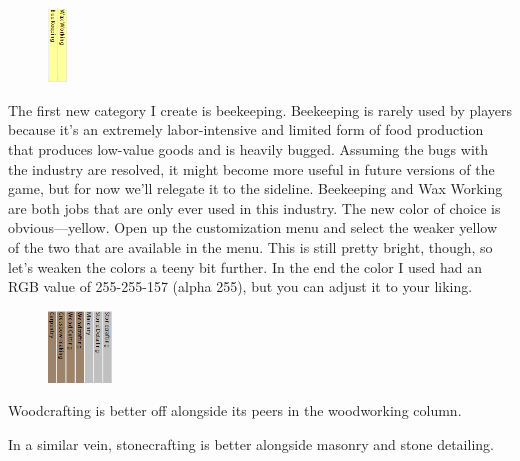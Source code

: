 \documentclass[]{article}
\begin{document}
\begin{figure}
\vspace{-20pt}
  \begin{center}
    \includegraphics[width=0.045\textwidth]{Sec3Fig19}
  \end{center}
\vspace{-15pt}
\end{figure}
The first new category I create is beekeeping. Beekeeping is rarely used by players because it's an
extremely labor-intensive and limited form of food production that produces low-value goods and is
heavily bugged. Assuming the bugs with the industry are resolved, it might become more useful in future
versions of the game, but for now we'll relegate it to the sideline.
Beekeeping and Wax Working are both jobs that are only ever used in this industry. The new color of
choice is obvious---yellow.
Open up the customization menu and select the weaker yellow of the two that are available in the menu.
This is still pretty bright, though, so let's weaken the colors a teeny bit further. In the end the color
I used had an RGB value of 255-255-157 (alpha 255), but you can adjust it to your liking.

\begin{figure}
  \begin{center}
    \includegraphics[width=0.15\textwidth]{Sec3Fig20}
  \end{center}
\vspace{-15pt}
\end{figure}
Woodcrafting is better off alongside its peers in the woodworking column.
\vspace{12pt}

In a similar vein, stonecrafting is better alongside masonry and stone detailing.
\vspace{12pt}
\end{document}
